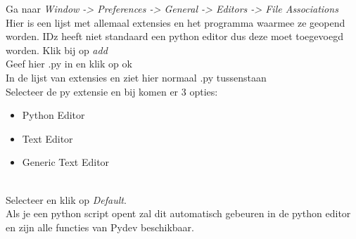 Ga naar \textit{Window -> Preferences -> General -> Editors -> File Associations} \\

Hier is een lijst met allemaal extensies en het programma waarmee ze geopend worden. IDz heeft niet standaard een python editor dus deze moet toegevoegd worden. Klik bij  op \textit{add} \\

Geef hier .py in en klik op ok \\

In de lijst van extensies en ziet hier normaal .py tussenstaan \\

Selecteer de py extensie en bij  komen er 3 opties:
\begin{itemize}
    \item Python Editor
    \item Text Editor
    \item Generic Text Editor
\end{itemize}
\\
Selecteer  en klik op \textit{Default}. \\


Als je een python script opent zal dit automatisch gebeuren in de python editor en zijn alle functies van Pydev beschikbaar.



